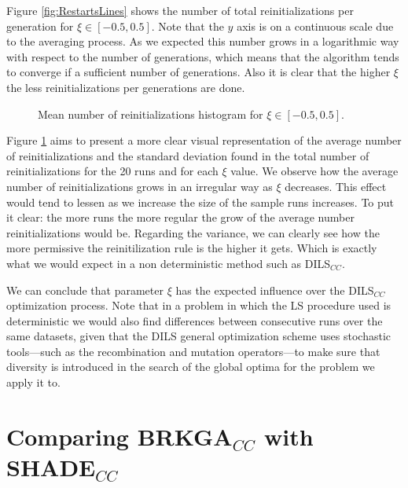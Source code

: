Figure \ref{fig:RestartsLines} shows the number of total reinitializations per generation for $\xi \in [-0.5,0.5]$. Note that the $y$ axis is on a continuous scale due to the averaging process. As we expected this number grows in a logarithmic way with respect to the number of generations, which means that the algorithm tends to converge if a sufficient number of generations. Also it is clear that the higher $\xi$ the less reinitializations per generations are done.


\begin{figure}[bth]
	\myfloatalign
	\hspace{1cm}
	\caption{Mean number of reinitializations histogram for $\xi \in [-0.5,0.5]$.}
	\label{fig:RestartsHist}
\end{figure}

Figure \ref{fig:RestartsHist} aims to present a more clear visual representation of the average number of reinitializations and the standard deviation found in the total number of reinitializations for the 20 runs and for each $\xi$ value. We observe how the average number of reinitializations grows in an irregular way as $\xi$ decreases. This effect would tend to lessen as we increase the size of the sample runs increases. To put it clear: the more runs the more regular the grow of the average number reinitializations would be. Regarding the variance, we can clearly see how the more permissive the reinitilization rule is the higher it gets. Which is exactly what we would expect in a non deterministic method such as \acs{DILS}$_{CC}$.

We can conclude that parameter $\xi$ has the expected influence over the \acs{DILS}$_{CC}$ optimization process. Note that in a problem in which the \acs{LS} procedure used is deterministic we would also find differences between consecutive runs over the same datasets, given that the \acs{DILS} general optimization scheme uses stochastic tools---such as the recombination and mutation operators---to make sure that diversity is introduced in the search of the global optima for the problem we apply it to.

\section{Comparing BRKGA$_{CC}$ with SHADE$_{CC}$} \label{sec:BRKGAvsSHADE}

